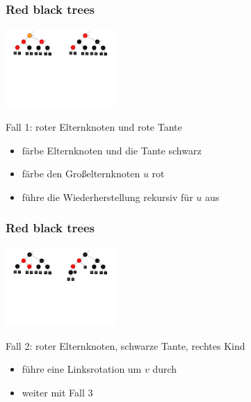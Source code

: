 \documentclass[aspectratio=1610, 11pt]{beamer}
\newcommand{\mytitle}{Red black trees}
\begin{document}
\begin{frame}\frametitle{\mytitle}
	\includegraphics[height=30mm]{./images/redblack_insert1.pdf}\hfill\includegraphics[height=30mm]{./images/redblack_insert1a.pdf}
	\begin{exampleblock}{Fall 1: roter Elternknoten und rote Tante}
		\begin{itemize}
			\item f\"arbe Elternknoten und die Tante schwarz
			\item f\"arbe den Gro\ss elternknoten $u$ rot
			\item f\"uhre die Wiederherstellung rekursiv f\"ur $u$ aus
		\end{itemize}
	\end{exampleblock}
\end{frame}

\begin{frame}\frametitle{\mytitle}
	\includegraphics[height=30mm]{./images/redblack_insert2.pdf}\hfill\includegraphics[height=30mm]{./images/redblack_insert2a.pdf}
	\begin{exampleblock}{Fall 2: roter Elternknoten, schwarze Tante, rechtes Kind}
		\begin{itemize}
			\item f\"uhre eine Linksrotation um $v$ durch
			\item weiter mit Fall 3
		\end{itemize}
	\end{exampleblock}
\end{frame}
\end{document}

